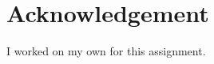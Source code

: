 \documentclass[10pt, a4paper]{article}
\begin{document}
\maketitlepage

\maketableofcontents




\section{Acknowledgement}
I worked on my own for this assignment.


\makereferences


\end{document}
